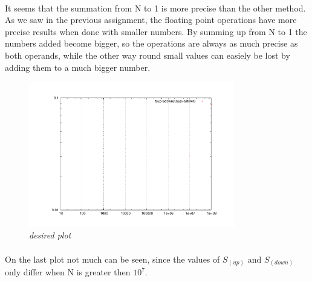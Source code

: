 \documentclass[11pt,a4paper,notitlepage,onecolumn]{article}
\begin{document}
\paragraph{} It seems that the summation from N to 1 is more precise than
the other method. As we saw in the previous assignment, the floating point
operations have more precise results when done with smaller numbers. By 
summing up from N to 1 the numbers added become bigger, so the operations
are always as much precise as both operands, while the other way round 
small values can easiely be lost by adding them to a much bigger number.

\begin{figure}
\centering
\includegraphics[width=0.8\textwidth]{aufgabe2-3-div.pdf}
\caption{\em \small desired plot}
\end{figure}

\paragraph{} On the last plot not much can be seen, since the values of
$S_{(up)}$ and $S_{(down)}$ only differ when N is greater then $10^7$.
\end{document}
